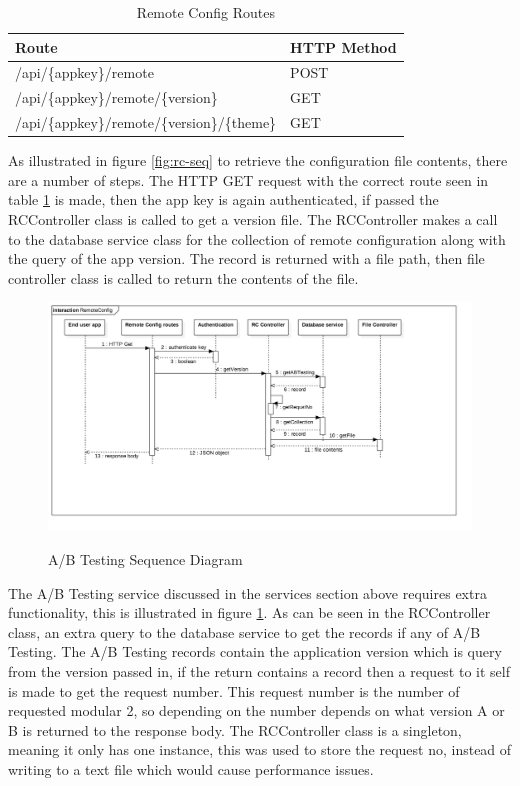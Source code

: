 \begin{table}[!h]
\centering
\caption{Remote Config Routes}
\label{tb:rc-routes}
\begin{tabular}{|l|l|}
\hline
\rowcolor{green!20}
Route                                        & HTTP Method \\ \hline
/api/\{appkey\}/remote                       & POST        \\ \hline
/api/\{appkey\}/remote/\{version\}           & GET         \\ \hline
/api/\{appkey\}/remote/\{version\}/\{theme\} & GET         \\ \hline
\end{tabular}
\end{table}

As illustrated in figure \ref{fig:rc-seq} to retrieve the configuration file contents, there are a number of steps. The HTTP GET request with the correct route seen in table \ref{tb:rc-routes} is made, then the app key is again authenticated, if passed the RCController class is called to get a version file. The RCController makes a call to the database service class for the collection of remote configuration along with the query of the app version. The record is returned with a file path, then file controller class is called to return the contents of the file. 

\begin{figure}[!h]
    \caption{A/B Testing Sequence Diagram}
    \centering
    \includegraphics[width=150mm]{images/sequence/ABTesting}
    \label{fig:ab-seq}
\end{figure} 

The A/B Testing service discussed in the services section above requires extra functionality, this is illustrated in figure \ref{fig:ab-seq}. As can be seen in the RCController class, an extra query to the database service to get the records if any of A/B Testing. The A/B Testing records contain the application version which is query from the version passed in, if the return contains a record then a request to it self is made to get the request number. This request number is the number of requested modular 2, so depending on the number depends on what version A or B is returned to the response body. The RCController class is a singleton, meaning it only has one instance, this was used to store the request no, instead of writing to a text file which would cause performance issues. 

